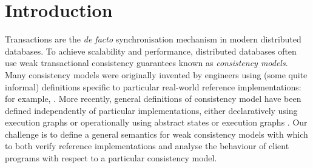 \section{Introduction}
\label{sec:intro}

Transactions are the \emph{de facto} synchronisation mechanism in
modern distributed databases. To achieve scalability and performance,
distributed databases often use weak transactional consistency
guarantees known as \emph{consistency models}.  Many consistency
models were originally invented by engineers using (some quite
informal) definitions specific to particular real-world reference
implementations: for example,
\cite{ramp,si,distrsi,clocksi,cops,PSI-RA,NMSI,PSI}.
More recently, general definitions of consistency model have been
defined independently of particular implementations, either
declaratively using execution graphs \cite{adya,ev_transactions} or
operationally using abstract 
states or execution graphs
\cite{seebelieve,alonetogether,sureshConcur}. 
Our challenge  is to define a general semantics for weak consistency
models with which to both verify reference implementations and analyse 
the behaviour of client programs with respect to a particular consistency model. 

